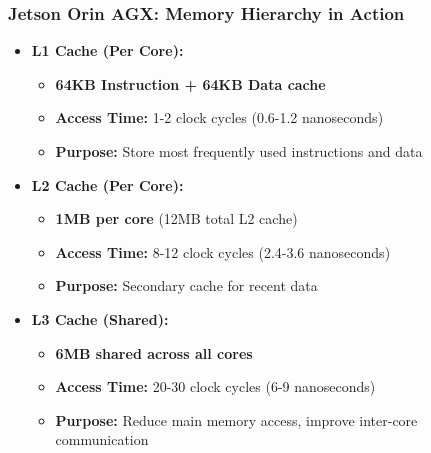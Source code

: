 \begin{frame}
\frametitle{Jetson Orin AGX: Memory Hierarchy in Action}
\begin{itemize}
    \item \textbf{L1 Cache (Per Core):}
    \begin{itemize}
        \item \textbf{64KB Instruction + 64KB Data cache}
        \item \textbf{Access Time:} 1-2 clock cycles (0.6-1.2 nanoseconds)
        \item \textbf{Purpose:} Store most frequently used instructions and data
    \end{itemize}
    \item \textbf{L2 Cache (Per Core):}
    \begin{itemize}
        \item \textbf{1MB per core} (12MB total L2 cache)
        \item \textbf{Access Time:} 8-12 clock cycles (2.4-3.6 nanoseconds)
        \item \textbf{Purpose:} Secondary cache for recent data
    \end{itemize}
    \item \textbf{L3 Cache (Shared):}
    \begin{itemize}
        \item \textbf{6MB shared across all cores}
        \item \textbf{Access Time:} 20-30 clock cycles (6-9 nanoseconds)
        \item \textbf{Purpose:} Reduce main memory access, improve inter-core communication
    \end{itemize}
\end{itemize}
\end{frame}

